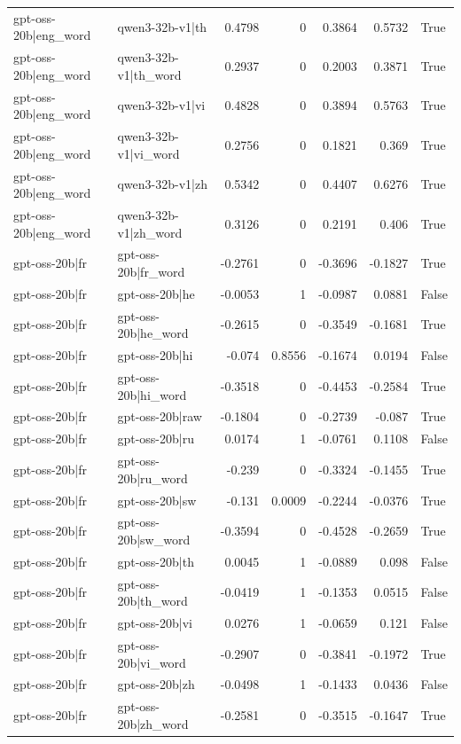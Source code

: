 \begin{table}
\begin{tabular}{l l r r r r l}
gpt-oss-20b|eng_word & qwen3-32b-v1|th & 0.4798 & 0 & 0.3864 & 0.5732 & True \\
gpt-oss-20b|eng_word & qwen3-32b-v1|th_word & 0.2937 & 0 & 0.2003 & 0.3871 & True \\
gpt-oss-20b|eng_word & qwen3-32b-v1|vi & 0.4828 & 0 & 0.3894 & 0.5763 & True \\
gpt-oss-20b|eng_word & qwen3-32b-v1|vi_word & 0.2756 & 0 & 0.1821 & 0.369 & True \\
gpt-oss-20b|eng_word & qwen3-32b-v1|zh & 0.5342 & 0 & 0.4407 & 0.6276 & True \\
gpt-oss-20b|eng_word & qwen3-32b-v1|zh_word & 0.3126 & 0 & 0.2191 & 0.406 & True \\
gpt-oss-20b|fr & gpt-oss-20b|fr_word & -0.2761 & 0 & -0.3696 & -0.1827 & True \\
gpt-oss-20b|fr & gpt-oss-20b|he & -0.0053 & 1 & -0.0987 & 0.0881 & False \\
gpt-oss-20b|fr & gpt-oss-20b|he_word & -0.2615 & 0 & -0.3549 & -0.1681 & True \\
gpt-oss-20b|fr & gpt-oss-20b|hi & -0.074 & 0.8556 & -0.1674 & 0.0194 & False \\
gpt-oss-20b|fr & gpt-oss-20b|hi_word & -0.3518 & 0 & -0.4453 & -0.2584 & True \\
gpt-oss-20b|fr & gpt-oss-20b|raw & -0.1804 & 0 & -0.2739 & -0.087 & True \\
gpt-oss-20b|fr & gpt-oss-20b|ru & 0.0174 & 1 & -0.0761 & 0.1108 & False \\
gpt-oss-20b|fr & gpt-oss-20b|ru_word & -0.239 & 0 & -0.3324 & -0.1455 & True \\
gpt-oss-20b|fr & gpt-oss-20b|sw & -0.131 & 0.0009 & -0.2244 & -0.0376 & True \\
gpt-oss-20b|fr & gpt-oss-20b|sw_word & -0.3594 & 0 & -0.4528 & -0.2659 & True \\
gpt-oss-20b|fr & gpt-oss-20b|th & 0.0045 & 1 & -0.0889 & 0.098 & False \\
gpt-oss-20b|fr & gpt-oss-20b|th_word & -0.0419 & 1 & -0.1353 & 0.0515 & False \\
gpt-oss-20b|fr & gpt-oss-20b|vi & 0.0276 & 1 & -0.0659 & 0.121 & False \\
gpt-oss-20b|fr & gpt-oss-20b|vi_word & -0.2907 & 0 & -0.3841 & -0.1972 & True \\
gpt-oss-20b|fr & gpt-oss-20b|zh & -0.0498 & 1 & -0.1433 & 0.0436 & False \\
gpt-oss-20b|fr & gpt-oss-20b|zh_word & -0.2581 & 0 & -0.3515 & -0.1647 & True \\

\end{tabular}
\end{table}
